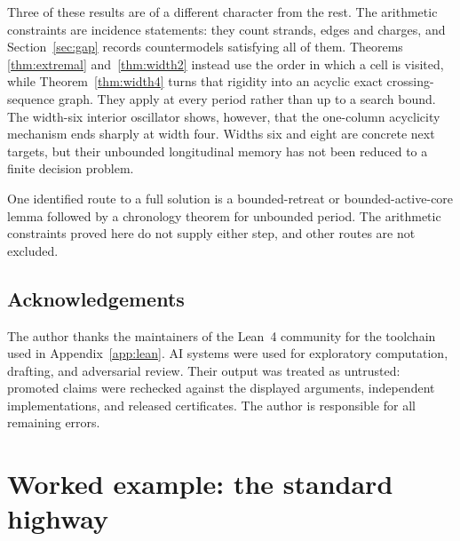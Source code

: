 \documentclass[11pt,reqno]{amsart}
\theoremstyle{plain}
\theoremstyle{definition}
\begin{document}
Three of these results are of a different character from the rest. The arithmetic
constraints are incidence statements: they count strands, edges and charges, and
Section~\ref{sec:gap} records countermodels satisfying all of them. Theorems
\ref{thm:extremal} and~\ref{thm:width2} instead use the order in which a cell is
visited, while Theorem~\ref{thm:width4} turns that rigidity into an acyclic exact
crossing-sequence graph.  They apply at every period rather than up to a search
bound.  The width-six interior oscillator shows, however, that the one-column
acyclicity mechanism ends sharply at width four.  Widths six and eight are concrete
next targets, but their unbounded longitudinal memory has not been reduced to a
finite decision problem.

One identified route to a full solution is a bounded-retreat or bounded-active-core
lemma followed by a chronology theorem for unbounded period.  The arithmetic
constraints proved here do not supply either step, and other routes are not excluded.

\subsection*{Acknowledgements}
The author thanks the maintainers of the Lean~4 community for the toolchain used in
Appendix~\ref{app:lean}. AI systems were used for exploratory computation, drafting,
and adversarial review.  Their output was treated as untrusted: promoted claims were
rechecked against the displayed arguments, independent implementations, and released
certificates.  The author is responsible for all remaining errors.

\appendix
\section{Worked example: the standard highway}\label{app:example}
\end{document}
